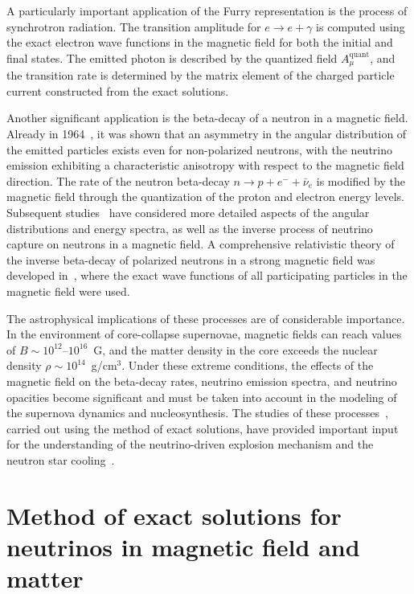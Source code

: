 \documentclass[a4paper,11pt]{article}
\begin{document}
A particularly important application of the Furry representation is the process of synchrotron radiation. The transition amplitude for $e \to e + \gamma$ is computed using the exact electron wave functions in the magnetic field for both the initial and final states. The emitted photon is described by the quantized field $A_\mu^{\text{quant}}$, and the transition rate is determined by the matrix element of the charged particle current constructed from the exact solutions.

Another significant application is the beta-decay of a neutron in a magnetic field. Already in 1964~\cite{Sokolov:Ternov:1964}, it was shown that an asymmetry in the angular distribution of the emitted particles exists even for non-polarized neutrons, with the neutrino emission exhibiting a characteristic anisotropy with respect to the magnetic field direction. The rate of the neutron beta-decay $n \to p + e^- + \bar{\nu}_e$ is modified by the magnetic field through the quantization of the proton and electron energy levels. Subsequent studies~\cite{Matese:Johnson:1969PR,Matese:Johnson:1969Nature} have considered more detailed aspects of the angular distributions and energy spectra, as well as the inverse process of neutrino capture on neutrons in a magnetic field. A comprehensive relativistic theory of the inverse beta-decay of polarized neutrons in a strong magnetic field was developed in~\cite{Shinkevich:Studenikin:2005}, where the exact wave functions of all participating particles in the magnetic field were used.

The astrophysical implications of these processes are of considerable importance. In the environment of core-collapse supernovae, magnetic fields can reach values of $B \sim 10^{12}\text{--}10^{16}$~G, and the matter density in the core exceeds the nuclear density $\rho \sim 10^{14}$~g/cm$^3$. Under these extreme conditions, the effects of the magnetic field on the beta-decay rates, neutrino emission spectra, and neutrino opacities become significant and must be taken into account in the modeling of the supernova dynamics and nucleosynthesis. The studies of these processes~\cite{Studenikin:2004PRD,Shinkevich:Studenikin:2005}, carried out using the method of exact solutions, have provided important input for the understanding of the neutrino-driven explosion mechanism and the neutron star cooling~\cite{Studenikin:2008JPA}.



\section{Method of exact solutions for neutrinos in magnetic field and matter}
\label{sec:nu-exact}
\end{document}
